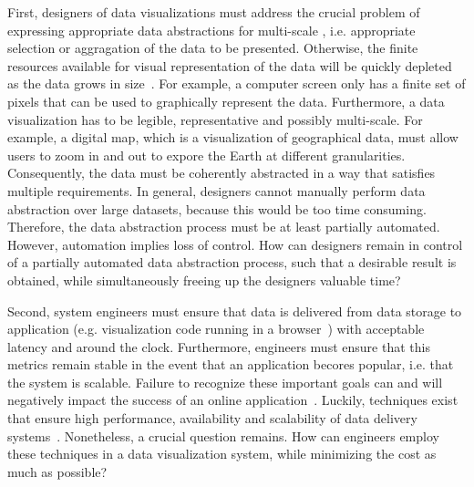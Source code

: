 First, designers of data visualizations must address the crucial problem of expressing appropriate data abstractions for multi-scale , i.e. appropriate selection or aggragation of the data to be presented. Otherwise, the finite resources available for visual representation of the data will be quickly depleted as the data grows in size~\cite{topfer:selection, weibel, stonebraker}. For example, a computer screen only has a finite set of pixels that can be used to graphically represent the data. Furthermore, a data visualization has to be legible, representative and possibly multi-scale. For example, a digital map, which is a visualization of geographical data, must allow users to zoom in and out to expore the Earth at different granularities. Consequently, the data must be coherently abstracted in a way that satisfies multiple requirements. In general, designers cannot manually perform data abstraction over large datasets, because this would be too time consuming. Therefore, the data abstraction process must be at least partially automated. However, automation implies loss of control. How can designers remain in control of a partially automated data abstraction process, such that a desirable result is obtained, while simultaneously freeing up the designers valuable time? %

Second, system engineers must ensure that data is delivered from data storage to application (e.g. visualization code running in a browser~\cite{d3}) with acceptable latency and around the clock. Furthermore, engineers must ensure that this metrics remain stable in the event that an application becores popular, i.e. that the system is scalable. Failure to recognize these important goals can and will negatively impact the success of an online application~\cite{latency:studies:google:and:amazon}. Luckily, techniques exist that ensure high performance, availability and scalability of data delivery systems~\cite{data:center:as:a:computer}. Nonetheless, a crucial question remains. How can engineers employ these techniques in a data visualization system, while minimizing the cost as much as possible? %

